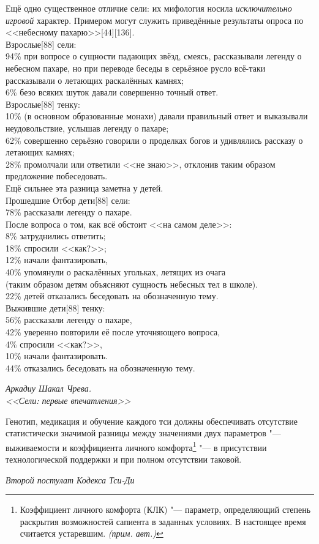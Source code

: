 \documentclass[a4paper,10pt]{book}
\newcommand{\authornote}{\textit{(прим. авт.)}}
\begin{document}
\epigraph{Ещё одно существенное отличие сели: их мифология носила \textit{исключительно игровой} характер.
Примером могут служить приведённые результаты опроса по <<небесному пахарю>>[44][136].\\
Взрослые[88] сели:\\
94\% при вопросе о сущности падающих звёзд, смеясь, рассказывали легенду о небесном пахаре, но при переводе беседы в серьёзное русло всё-таки рассказывали о летающих раскалённых камнях;\\
6\% безо всяких шуток давали совершенно точный ответ.\\
Взрослые[88] тенку:\\
10\% (в основном образованные монахи) давали правильный ответ и выказывали неудовольствие, услышав легенду о пахаре;\\
62\% совершенно серьёзно говорили о проделках богов и удивлялись рассказу о летающих камнях;\\
28\% промолчали или ответили <<не знаю>>, отклонив таким образом предложение побеседовать.\\
Ещё сильнее эта разница заметна у детей.\\ 
Прошедшие Отбор дети[88] сели:\\
78\% рассказали легенду о пахаре.\\
После вопроса о том, как всё обстоит <<на самом деле>>:\\ 
8\% затруднились ответить;\\
18\% спросили <<как?>>;\\
12\% начали фантазировать,\\
40\% упомянули о раскалённых угольках, летящих из очага\\
(таким образом детям объясняют сущность небесных тел в школе).\\
22\% детей отказались беседовать на обозначенную тему.\\
Выжившие дети[88] тенку:\\
56\% рассказали легенду о пахаре,\\
42\% уверенно повторили её после уточняющего вопроса,\\
4\% спросили <<как?>>,\\
10\% начали фантазировать.\\
44\% отказались беседовать на обозначенную тему.}
{\textit{Аркадиу Шакал Чрева.\\<<Сели: первые впечатления>>}}

\epigraph{Генотип, медикация и обучение каждого тси должны обеспечивать отсутствие статистически значимой разницы между значениями двух параметров "--- выживаемости и коэффициента личного комфорта\footnote
{Коэффициент личного комфорта (КЛК) "--- параметр, определяющий степень раскрытия возможностей сапиента в заданных условиях.
В настоящее время считается устаревшим. \authornote}
"--- в присутствии технологической поддержки и при полном отсутствии таковой.}
{\textit{Второй постулат Кодекса Тси-Ди}}
\end{document}
